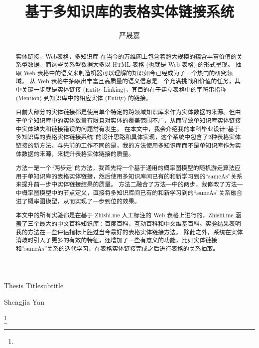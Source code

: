 \documentclass[bachelor]{seuthesis} %
\begin{document}

\title{基于多知识库的表格实体链接系统}{}{Thesis Title}{subtitle}
\author{严晟嘉}{Shengjia Yan}

\address{东南大学九龙湖校区}
\thanks{}
\maketitle

\begin{abstract}{实体链接，Web表格，多知识库}
在当今的万维网上包含着超大规模的蕴含丰富价值的关系型数据，而这些关系型数据大多以 HTML 表格 (也就是 Web 表格) 的形式呈现。
抽取 Web 表格中的语义来制造机器可以理解的知识如今已经成为了一个热门的研究领域。
从 Web 表格中抽取出丰富且高质量的语义信息是一个充满挑战和价值的任务，其中关键一步就是实体链接 (Entity Linking)，其目的在于建立表格中的字符串指称 (Mention) 到知识库中的相应实体 (Entity) 的链接。\par

目前大部分的实体链接都是使用单个特定的跨领域知识库来作为实体数据的来源。但由于单个知识库中的实体数量有限且对实体的覆盖范围不广，从而导致单知识库实体链接中实体缺失和链接错误的问题常有发生。
在本文中，我会介绍我的本科毕业设计``基于多知识库的表格实体链接系统''的设计思路和具体实现，这个系统中包含了2种表格实体链接的新方法。与先前的工作不同的是，我的方法使用多知识库而不是单知识库作为实体数据的来源，来提升表格实体链接的质量。\par

方法一是一个``两步走''的方法，我首先将一个基于通用的概率图模型的随机游走算法应用于单知识库的表格实体链接，然后使用多知识库间已有的和新学习到的``sameAs''关系来提升前一步中实体链接结果的质量。
方法二融合了方法一中的两步，我修改了方法一中概率图模型中的节点定义，直接将多知识库间已有的和新学习到的``sameAs''关系融合进了概率图模型，从而实现了一步到位的效果。\par

本文中的所有实验都是在基于 Zhishi.me 人工标注的 Web 表格上进行的，Zhishi.me 涵盖了三个最大的中文百科知识库：百度百科，互动百科和中文维基百科。实验结果表明我的方法在一些评估指标上胜过当今最好的表格实体链接方法。
除此之外，系统在实体消岐时引入了更多的有效的特征，还增加了一些有意义的功能，比如实体链接和``sameAs''关系的迭代学习，在表格实体链接完成之后进行表格的关系抽取。
\end{abstract}
\end{document}
